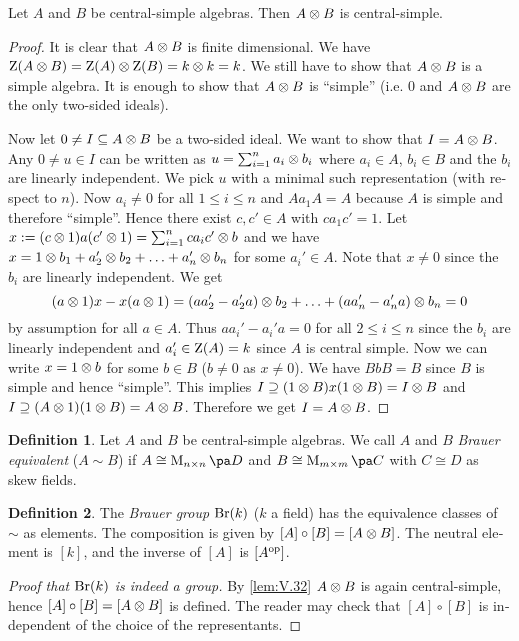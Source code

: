 \documentclass[12pt,a4paper]{scrartcl}
\theoremstyle{cplain}
\theoremstyle{cplain}
\theoremstyle{cplain}
\theoremstyle{definition}
\newtheorem*{deff}{Definition}
\begin{document}
\begin{otherlanguage}{english}
\begin{lem} \label{lem:V.32} %
  Let $A$ and $B$ be central-simple algebras. Then $A \otimes B$ is central-simple.
\end{lem}
\begin{proof}
  It is clear that $A \otimes B$ is finite dimensional. We have $\operatorname{Z}(A\otimes B) = \operatorname{Z}(A)\otimes \operatorname{Z}(B) = k\otimes k = k$. We still have to show that $A\otimes B$ is a simple algebra. It is enough to show that $A\otimes B$ is \enquote{simple} (i.e. $0$ and $A\otimes B$ are the only two-sided ideals).
  
  Now let $0\ne I \subseteq A\otimes B$ be a two-sided ideal. We want to show that $I=A \otimes B$. Any $0\neq u \in I$ can be written as $u=\sum_{i=1}^na_i\otimes b_i$ where $a_i\in A$, $b_i\in B$ and the $b_i$ are linearly independent. We pick $u$ with a minimal such representation (with respect to $n$). Now $a_i \neq 0$ for all $1\le i\le n$ and $Aa_1A = A$ because $A$ is simple and therefore \enquote{simple}. Hence there exist $c,c'\in A$ with $ca_1c' = 1$. Let $x := (c\otimes 1)a(c'\otimes1) = \sum_{i=1}^nca_ic'\otimes b$ and we have $x = 1\otimes b_1 + a_2'\otimes b_2 + \ldots + a_n' \otimes b_n$ for some $a_i' \in A$. Note that $x\neq 0$ since the $b_i$ are linearly independent. We get \[ (a \otimes 1)x - x(a\otimes 1) = (aa_2' - a_2'a) \otimes b_2 + \ldots + (aa_n' -a_n'a)\otimes b_n = 0 \] by assumption for all $a\in A$. Thus $aa_i' -a_i'a = 0$ for all $2\le i\le n$ since the $b_i$ are linearly independent and $a_i' \in \operatorname{Z}(A) = k$ since $A$ is central simple. Now we can write $ x = 1 \otimes b$ for some $b\in B$ ($b\neq 0$ as $x\neq 0$). We have $BbB = B$ since $B$ is simple and hence \enquote{simple}. This implies $I \supseteq (1\otimes B) x(1 \otimes B) = I\otimes B$ and $I \supseteq (A \otimes 1)(1\otimes B) = A\otimes B$. Therefore we get $I = A \otimes B$.
\end{proof}


\begin{deff}
  Let $A$ and $B$ be central-simple algebras. We call $A$ and $B$ \emph{Brauer equivalent} ($A \sim B$) if $A \cong \Mat nD$ and $B \cong \Mat mC$ with $C \cong D$ as skew fields.
\end{deff}

\begin{deff}
  The \emph{Brauer group} $\operatorname{Br}(k)$ ($k$ a field) has the equivalence classes of $\sim$ as elements. The composition is given by $[A]\circ [B] = [A\otimes B]$. The neutral element is $[k]$, and the inverse of $[A]$ is $[A^{\operatorname{op}}]$.
\end{deff}
\begin{proof}[Proof that $\operatorname{Br}(k)$ is indeed a group]
  By \cref{lem:V.32} $A \otimes B$ is again central-simple, hence $[A]\circ[B] = [A \otimes B]$ is defined. The reader may check that $[A]\circ [B]$ is independent of the choice of the representants.
  

\end{proof}
\end{otherlanguage}
\end{document}
